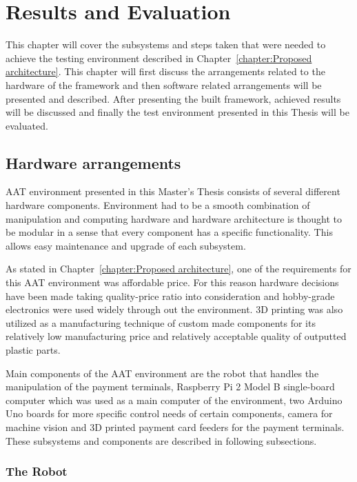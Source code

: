 
\chapter{Results and Evaluation}
\label{chapter:Results and Evaluation}

This chapter will cover the subsystems and steps taken that were needed to achieve the testing environment described in Chapter~\ref{chapter:Proposed architecture}. This chapter will first discuss the arrangements related to the hardware of the framework and then software related arrangements will be presented and described. After presenting the built framework, achieved results will be discussed and finally the test environment presented in this Thesis will be evaluated.

\section{Hardware arrangements}
\label{section:Hardware arrangements}

AAT environment presented in this Master's Thesis consists of several different hardware components. Environment had to be a smooth combination of manipulation and computing hardware and hardware architecture is thought to be modular in a sense that every component has a specific functionality. This allows easy maintenance and upgrade of each subsystem.

As stated in Chapter~\ref{chapter:Proposed architecture}, one of the requirements for this AAT environment was affordable price. For this reason hardware decisions have been made taking quality-price ratio into consideration and hobby-grade electronics were used widely through out the environment. 3D printing was also utilized as a manufacturing technique of custom made components for its relatively low manufacturing price and relatively acceptable quality of outputted plastic parts.

Main components of the AAT environment are the robot that handles the manipulation of the payment terminals, Raspberry Pi 2 Model B single-board computer which was used as a main computer of the environment, two Arduino Uno boards for more specific control needs of certain components, camera for machine vision and 3D printed payment card feeders for the payment terminals. These subsystems and components are described in following subsections.

\subsection{The Robot}
\label{subsection:Robot}

